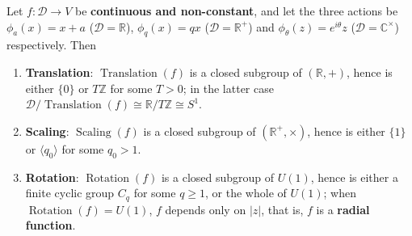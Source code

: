 \begin{proposition}\label{prop:invariance_subgroup_structure}
Let $f:\mathcal{D}\to V$ be \textbf{continuous and non-constant}, and let the three actions be $\phi_a(x)=x+a$ ($\mathcal{D}=\mathbb{R}$), $\phi_q(x)=qx$ ($\mathcal{D}=\mathbb{R}^+$) and $\phi_\theta(z)=e^{i\theta}z$ ($\mathcal{D}=\mathbb{C}^\times$) respectively. Then
\begin{enumerate}[label=(\roman*)]
    \item \textbf{Translation}: $\operatorname{Translation}(f)$ is a closed subgroup of $(\mathbb{R},+)$, hence is either $\{0\}$ or $T\mathbb{Z}$ for some $T>0$; in the latter case $\mathcal{D}/\operatorname{Translation}(f)\cong\mathbb{R}/T\mathbb{Z}\cong S^1$.
    \item \textbf{Scaling}: $\operatorname{Scaling}(f)$ is a closed subgroup of $(\mathbb{R}^+,\times)$, hence is either $\{1\}$ or $\langle q_0\rangle$ for some $q_0>1$.
    \item \textbf{Rotation}: $\operatorname{Rotation}(f)$ is a closed subgroup of $U(1)$, hence is either a finite cyclic group $C_q$ for some $q\ge1$, or the whole of $U(1)$; when $\operatorname{Rotation}(f)=U(1)$, $f$ depends only on $|z|$, that is, $f$ is a \textbf{radial function}.
\end{enumerate}
\end{proposition}

